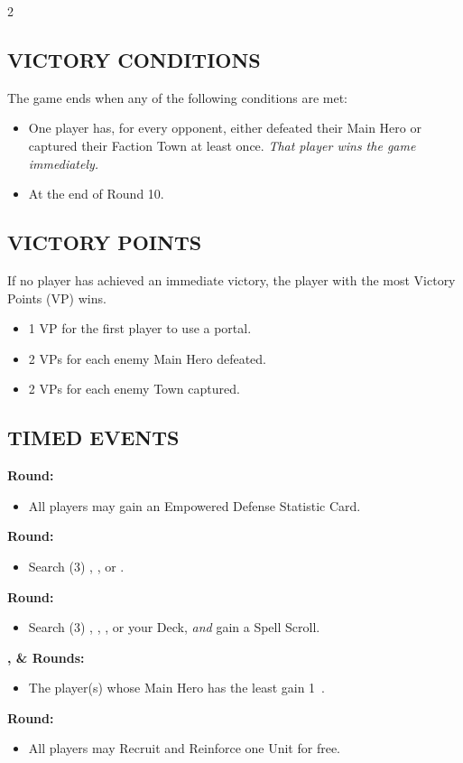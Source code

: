 \begin{multicols*}{2}
\subsection*{\MakeUppercase{Victory Conditions}}
The game ends when any of the following conditions are met:

\begin{itemize}
  \item One player has, for every opponent, either defeated their Main Hero or captured their Faction Town at least once. \textit{That player wins the game immediately.}
  \item At the end of Round 10.
\end{itemize}

\subsection*{\MakeUppercase{Victory Points}}
If no player has achieved an immediate victory, the player with the most Victory Points (VP) wins.

\begin{itemize}
  \item 1 VP for the first player to use a portal.
  \item 2 VPs for each enemy Main Hero defeated.
  \item 2 VPs for each enemy Town captured.
\end{itemize}

\subsection*{\MakeUppercase{Timed Events}}
\textbf{ Round:}
\begin{itemize}
  \item All players may gain an Empowered Defense Statistic Card.
\end{itemize}
\textbf{ Round:}
\begin{itemize}
  \item Search (3) , , or .
\end{itemize}
\textbf{ Round:}
\begin{itemize}
  \item Search (3) , , , or your Deck, \textit{and} gain a Spell Scroll.
\end{itemize}
\textbf{,  \&  Rounds:}
\begin{itemize}
  \item The player(s) whose Main Hero has the least  gain 1~.
\end{itemize}
\textbf{ Round:}
\begin{itemize}
  \item All players may Recruit and Reinforce one  Unit for free.
\end{itemize}


\end{multicols*}
